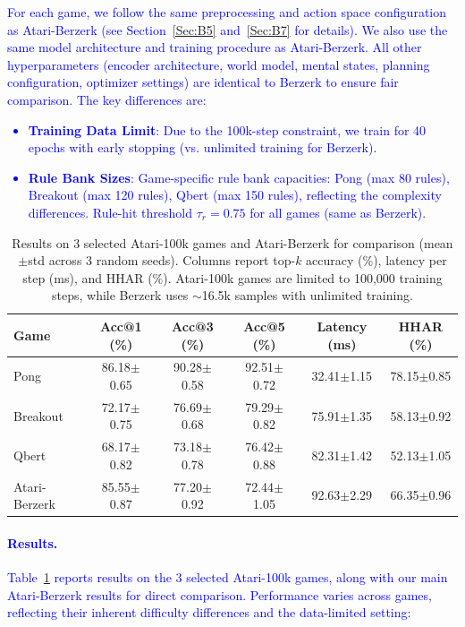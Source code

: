 \documentclass{article} %
\newcommand{\revise}[1]{\textcolor{blue}{#1}}
\begin{document}
\revise{For each game, we follow the same preprocessing and action space configuration as Atari-Berzerk (see Section~\ref{Sec:B5} and~\ref{Sec:B7} for details). We also use the same model architecture and training procedure as Atari-Berzerk. All other hyperparameters (encoder architecture, world model, mental states, planning configuration, optimizer settings) are identical to Berzerk to ensure fair comparison. The key differences are:}
\revise{\begin{itemize}
    \item \textbf{Training Data Limit}: Due to the 100k-step constraint, we train for 40 epochs with early stopping (vs. unlimited training for Berzerk).
    \item \textbf{Rule Bank Sizes}: Game-specific rule bank capacities: Pong (max 80 rules), Breakout (max 120 rules), Qbert (max 150 rules), reflecting the complexity differences. Rule-hit threshold $\tau_r=0.75$ for all games (same as Berzerk).
\end{itemize}}
\begin{table}[!t]
\centering
\small
\caption{Results on 3 selected Atari-100k games and Atari-Berzerk for comparison (mean$\pm$std across 3 random seeds). Columns report top-$k$ accuracy (\%), latency per step (ms), and HHAR (\%). Atari-100k games are limited to 100,000 training steps, while Berzerk uses $\sim$16.5k samples with unlimited training.}
\label{tab:atari100k_results}
\begin{tabular}{lccccc}
\toprule
\textbf{Game} & Acc@1 (\%) & Acc@3 (\%) & Acc@5 (\%) & Latency (ms) & HHAR (\%) \\
\midrule
Pong & 86.18$\pm$0.65 & 90.28$\pm$0.58 & 92.51$\pm$0.72 & 32.41$\pm$1.15 & 78.15$\pm$0.85 \\
Breakout & 72.17$\pm$0.75 & 76.69$\pm$0.68 & 79.29$\pm$0.82 & 75.91$\pm$1.35 & 58.13$\pm$0.92 \\
Qbert & 68.17$\pm$0.82 & 73.18$\pm$0.78 & 76.42$\pm$0.88 & 82.31$\pm$1.42 & 52.13$\pm$1.05 \\
\midrule
Atari-Berzerk & 85.55$\pm$0.87 & 77.20$\pm$0.92 & 72.44$\pm$1.05 & 92.63$\pm$2.29 & 66.35$\pm$0.96 \\
\bottomrule
\end{tabular}
\end{table}
\revise{\paragraph{Results.}
Table~\ref{tab:atari100k_results} reports results on the 3 selected Atari-100k games, along with our main Atari-Berzerk results for direct comparison. Performance varies across games, reflecting their inherent difficulty differences and the data-limited setting:}
\end{document}
